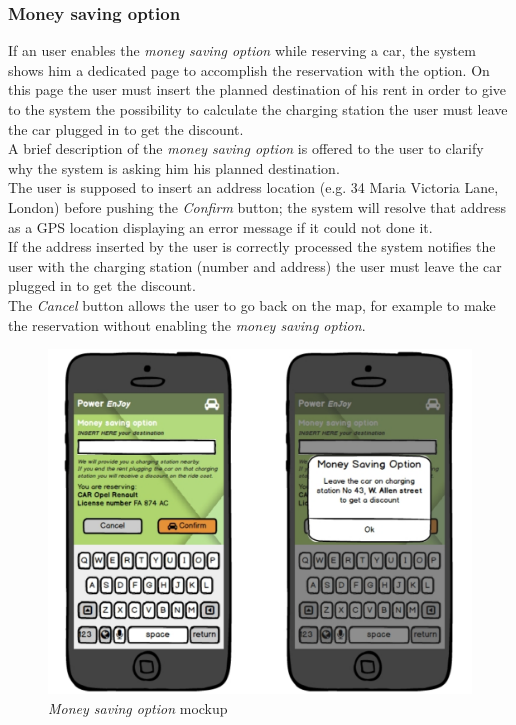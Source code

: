 \subsubsection{Money saving option}

If an user enables the \emph{money saving option} while reserving a car, the system shows him a dedicated page to accomplish the reservation with the option. On this page the user must insert the planned destination of his rent in order to give to the system the possibility to calculate the charging station the user must leave the car plugged in to get the discount.\\

A brief description of the \emph{money saving option} is offered to the user to clarify why the system is asking him his planned destination. \\

The user is supposed to insert an address location (e.g. 34 Maria Victoria Lane, London) before pushing the \emph{Confirm} button; the system will resolve that address as a GPS location displaying an error message if it could not done it. \\

If the address inserted by the user is correctly processed the system notifies the user with the charging station (number and address) 
the user must leave the car plugged in to get the discount. \\

The \emph{Cancel} button allows the user to go back on the map, for example to make the reservation without enabling the \emph{money saving option}.\\

\begin{figure}[h]
			\centering
			\includegraphics[width=0.9\linewidth]{mockups/moneySavingOption}
			\caption{
				\label{fig:msOption} 
				\emph{Money saving option} mockup
			}
		\end{figure}

